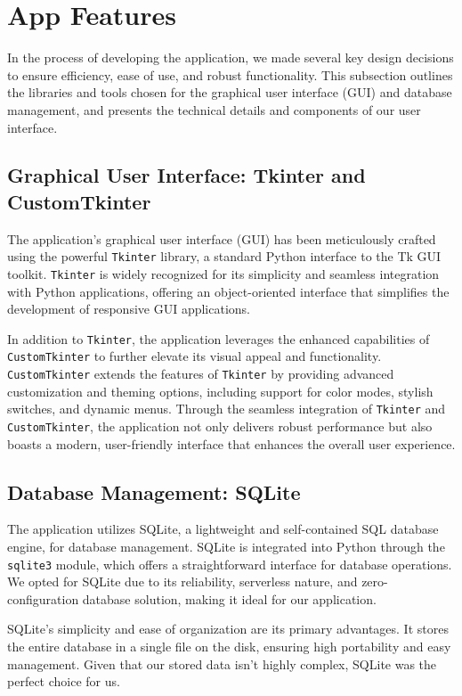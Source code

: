 \section{App Features}

In the process of developing the application, we made several key design decisions to ensure efficiency, ease of use, and robust functionality. This subsection outlines the libraries and tools chosen for the graphical user interface (GUI) and database management, and presents the technical details and components of our user interface.

\subsection{Graphical User Interface: Tkinter and CustomTkinter}

The application's graphical user interface (GUI) has been meticulously crafted using the powerful \texttt{Tkinter} library, a standard Python interface to the Tk GUI toolkit. \texttt{Tkinter} is widely recognized for its simplicity and seamless integration with Python applications, offering an object-oriented interface that simplifies the development of responsive GUI applications.

In addition to \texttt{Tkinter}, the application leverages the enhanced capabilities of \texttt{CustomTkinter} to further elevate its visual appeal and functionality. \texttt{CustomTkinter} extends the features of \texttt{Tkinter} by providing advanced customization and theming options, including support for color modes, stylish switches, and dynamic menus. Through the seamless integration of \texttt{Tkinter} and \texttt{CustomTkinter}, the application not only delivers robust performance but also boasts a modern, user-friendly interface that enhances the overall user experience.

\subsection{Database Management: SQLite}

The application utilizes SQLite, a lightweight and self-contained SQL database engine, for database management. SQLite is integrated into Python through the \texttt{sqlite3} module, which offers a straightforward interface for database operations. We opted for SQLite due to its reliability, serverless nature, and zero-configuration database solution, making it ideal for our application.

SQLite's simplicity and ease of organization are its primary advantages. It stores the entire database in a single file on the disk, ensuring high portability and easy management. Given that our stored data isn't highly complex, SQLite was the perfect choice for us.

